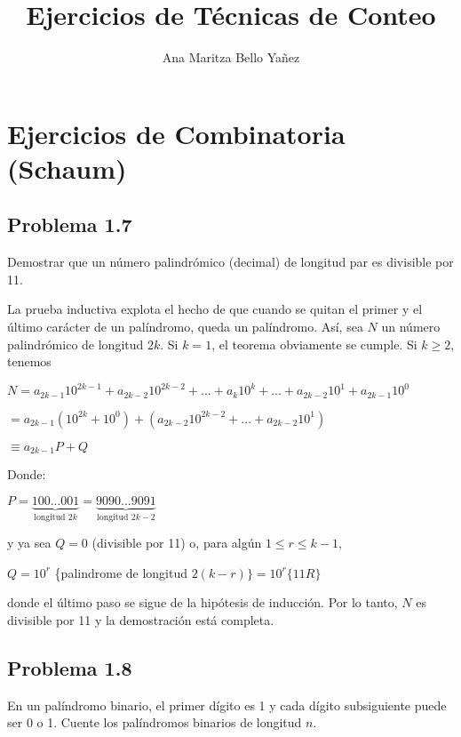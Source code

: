 \documentclass[12pt]{article}
\begin{document}
\title{Ejercicios de Técnicas de Conteo}
\author{Ana Maritza Bello Ya\~nez}
\maketitle
\setlength{\parindent}{0pt}
\setlength{\parskip}{1em}

\section*{Ejercicios de Combinatoria (Schaum)}

\subsection*{Problema 1.7}
Demostrar que un número palindrómico (decimal) de longitud par es divisible por
11.

La prueba inductiva explota el hecho de que cuando se quitan el primer y el
último carácter de un palíndromo, queda un palíndromo. Así, sea $N$ un número
palindrómico de longitud $2k$. Si $k = 1$, el teorema obviamente se cumple. Si
$k \geq 2$, tenemos

$ N = a_{2k-1} 10^{2k-1} + a_{2k-2} 10^{2k-2} + ... + a_{k} 10^{k} + ... +
a_{2k-2} 10^{1} + a_{2k-1} 10^{0} $

$ = a_{2k-1}(10^{2k}+10^0) + (a_{2k-2}10^{2k-2}+...+ a_{2k-2}10^{1}) $

$ \equiv a_{2k-1} P + Q$

Donde:

$P = \underbrace{100...001}_{\text{longitud } 2k} =
\underbrace{9090...9091}_{\text{longitud } 2k-2}$

y ya sea $Q=0$ (divisible por 11) o, para algún $1 \leq r \leq k-1$,

$Q = 10^r$ \{palindrome de longitud $ 2(k-r)\} = 10^r\{11R\} $

donde el último paso se sigue de la hipótesis de inducción. Por lo tanto, $N$ es
divisible por 11 y la demostración está completa.

\subsection*{Problema 1.8}

En un palíndromo binario, el primer dígito es 1 y cada dígito subsiguiente puede
ser 0 o 1. Cuente los palíndromos binarios de longitud $n$.
\end{document}
